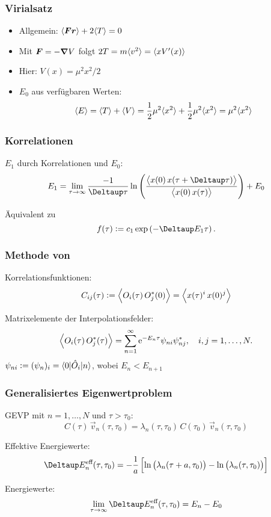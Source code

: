 \documentclass[ngerman, fleqn]{beamer}
\newcommand\timestep{a}
\renewcommand\eup{\text e}
\begin{document}
\begin{frame}
    \frametitle{Virialsatz}

    \begin{itemize}
    
        \item
    Allgemein: $\langle \boldsymbol{F} \boldsymbol{r} \rangle + 2 \langle T \rangle = 0$

\item
    Mit $\boldsymbol{F} = - \boldsymbol{\nabla} V$ folgt $2 T = m \langle v^2 \rangle = \langle x V'(x) \rangle$

\item
    Hier: $V(x) = \mu^2 x^2 /2$

\item
    $E_0$ aus verfügbaren Werten:
    \[
        \langle E \rangle = \langle T \rangle + \langle V \rangle
        = \frac12 \mu^2 \langle x^2 \rangle + \frac12 \mu^2 \langle x^2 \rangle
        = \mu^2 \langle x^2 \rangle
    \]
    \end{itemize}
\end{frame}

\begin{frame}
    \frametitle{Korrelationen}

    $E_1$ durch Korrelationen und $E_0$:
    \[
        E_1 = \lim_{\tau \to \infty} \frac{-1}{\Deltaup \tau} \ln
        \del{\frac{\Bracket{x(0) \, x(\tau + \Deltaup \tau)}}{\Bracket{x(0) \,
        x(\tau)}}} + E_0
    \]

    Äquivalent zu
    \[
        f(\tau) := c_1 \exp\del{-\Deltaup E_1 \tau}.
    \]
\end{frame}


\begin{frame}
    \frametitle{Methode von \cite{Blossier/Eigenvalue}}

    Korrelationsfunktionen:
    \[
        C_{ij}(\tau) := \left\langle O_i(\tau) \, O_j^*(0) \right\rangle
        = \left\langle x(\tau)^i \, x(0)^j \right\rangle
    \]

    Matrixelemente der Interpolationsfelder:
    \[
        \Bracket{O_i(\tau) \, O_j^*(\tau)}
        = \sum_{n=1}^\infty \eup^{-E_n \tau} \psi_{ni} \psi_{nj}^*
        \eqnsep
        i, j = 1, \ldots, N.
    \]
    $\psi_{ni} := (\psi_n)_i = \braket{0 | \hat O_i | n}$, wobei $E_n < E_{n+1}$
\end{frame}

\begin{frame}
    \frametitle{Generalisiertes Eigenwertproblem}

    GEVP mit $n = 1, \ldots, N$ und $\tau > \tau_0$:
    \[
        C(\tau) \, \vec v_n(\tau, \tau_0) = \lambda_n(\tau, \tau_0) \, 
        C(\tau_0) \, \vec v_n(\tau, \tau_0)
    \]

    Effektive Energiewerte:
    \[
        \Deltaup E_n^\text{eff}(\tau, \tau_0) = -
        \frac 1\timestep \sbr{ \ln\del{\lambda_n(\tau+\timestep, \tau_0)} -
        \ln\del{\lambda_n(\tau, \tau_0)} }
    \]

    Energiewerte:
    \[
        \lim_{\tau \to \infty} \Deltaup E_n^\text{eff}(\tau, \tau_0) = E_n - E_0
    \]

\end{frame}
\end{document}
